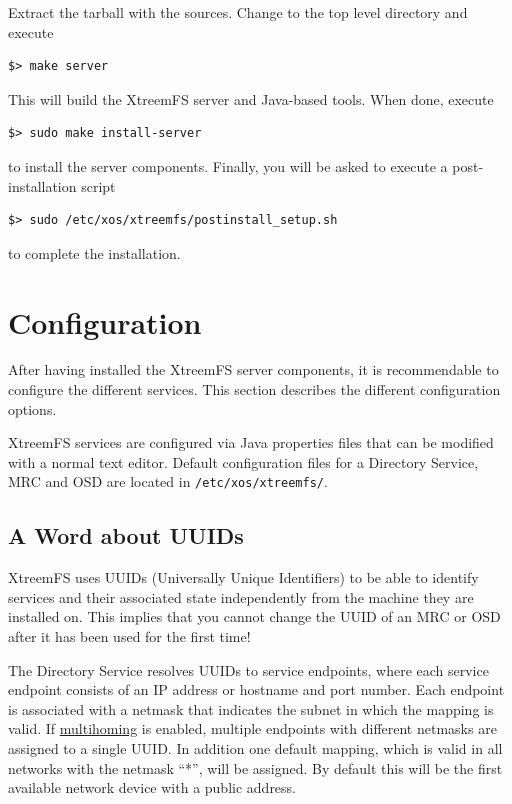 \documentclass[a4paper,10pt]{book}
\begin{document}
Extract the tarball with the sources. Change to the top level directory and execute

\begin{verbatim}
$> make server
\end{verbatim}

This will build the XtreemFS server and Java-based tools. When done, execute

\begin{verbatim}
$> sudo make install-server
\end{verbatim}

to install the server components. Finally, you will be asked to execute a post-installation script

\begin{verbatim}
$> sudo /etc/xos/xtreemfs/postinstall_setup.sh
\end{verbatim}

to complete the installation.

\section{Configuration}
\label{sec:service_config}

After having installed the XtreemFS server components, it is recommendable to configure the different services. This section describes the different configuration options.

XtreemFS services are configured via Java properties files that can be modified with a normal text editor. Default configuration files for a Directory Service, MRC and OSD are located in \texttt{/etc/xos/xtreemfs/}.

\subsection{A Word about UUIDs}

XtreemFS uses UUIDs (Universally Unique Identifiers) to be able to identify services and their associated state independently from the machine they are installed on. This implies that you cannot change the UUID of an MRC or OSD after it has been used for the first time!

The Directory Service resolves UUIDs to service endpoints, where each service endpoint consists of an IP address or hostname and port number. Each endpoint is associated with a netmask that indicates the subnet in which the mapping is valid. If \hyperref[option:multihoming.enabled]{multihoming} is enabled, multiple endpoints with different netmasks are assigned to a single UUID. In addition one default mapping, which is valid in all networks with the netmask ``*'', will be assigned. By default this will be the first available network device with a public address.
\end{document}
